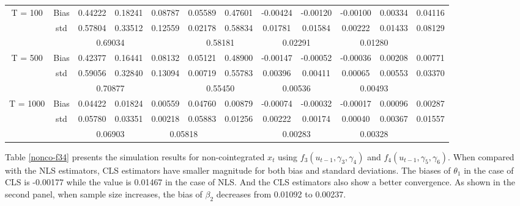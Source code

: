 \documentclass[a4paper,12pt,times,numbered,print,index]{report}
\numberwithin{equation}{section}
\begin{document}
\begin{table}[htbp]
\begin{adjustbox}{max width=\textwidth}
\begin{tabular}{cccccccccccc}
		\midrule
		\multirow{3}[1]{*}{T = 100} & Bias  & 0.44222 & 0.18241 & 0.08787 & 0.05589 & 0.47601 & -0.00424 & -0.00120 & -0.00100 & 0.00334 & 0.04116 \\
		& std   & 0.57804 & 0.33512 & 0.12559 & 0.02178 & 0.58834 & 0.01781 & 0.01584 & 0.00222 & 0.01433 & 0.08129 \\
		&       & \multicolumn{2}{c}{\textcolor[rgb]{ .329,  .51,  .208}{0.69034}} &       & \multicolumn{2}{c}{0.58181} & \multicolumn{2}{c}{\textcolor[rgb]{ .329,  .51,  .208}{0.02291}} & \multicolumn{2}{c}{0.01280} &  \\
		\multirow{3}[0]{*}{T = 500} & Bias  & 0.42377 & 0.16441 & 0.08132 & 0.05121 & 0.48900 & -0.00147 & -0.00052 & -0.00036 & 0.00208 & 0.00771 \\
		& std   & 0.59056 & 0.32840 & 0.13094 & 0.00719 & 0.55783 & 0.00396 & 0.00411 & 0.00065 & 0.00553 & 0.03370 \\
		&       & \multicolumn{2}{c}{\textcolor[rgb]{ .329,  .51,  .208}{0.70877}} &       & \multicolumn{2}{c}{0.55450} & \multicolumn{2}{c}{\textcolor[rgb]{ .329,  .51,  .208}{0.00536}} & \multicolumn{2}{c}{0.00493} &  \\
		\multirow{3}[1]{*}{T = 1000} & Bias  & 0.04422 & 0.01824 & 0.00559 & 0.04760 & 0.00879 & -0.00074 & -0.00032 & -0.00017 & 0.00096 & 0.00287 \\
		& std   & 0.05780 & 0.03351 & 0.00218 & 0.05883 & 0.01256 & 0.00222 & 0.00174 & 0.00040 & 0.00367 & 0.01557 \\
		&       & \multicolumn{2}{c}{\textcolor[rgb]{ .329,  .51,  .208}{0.06903}} & \multicolumn{2}{c}{0.05818} &       & \multicolumn{2}{c}{\textcolor[rgb]{ .329,  .51,  .208}{0.00283}} & \multicolumn{2}{c}{0.00328} &  \\
		\bottomrule
		\bottomrule
    	\end{tabular}%
		\end{adjustbox}
	\label{nonco-f12}%
\end{table}%

Table \ref{nonco-f34} presents the simulation results for non-cointegrated $x_t$ using $f_3 (u_{t-1}, \gamma_3, \gamma_4)$ and $f_4 (u_{t-1}, \gamma_5, \gamma_6)$. When compared with the NLS estimators, CLS estimators have smaller magnitude for both bias and standard deviations. The biases of $\theta_1$ in the case of CLS is -0.00177 while the value is 0.01467 in the case of NLS. And the CLS estimators also show a better convergence. As shown in the second panel, when sample size increases, the bias of $\beta_2$ decreases from 0.01092 to 0.00237. 
\end{document}
